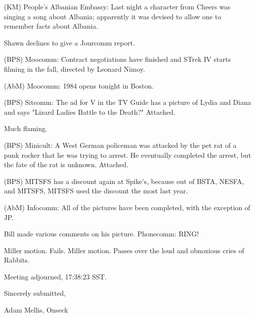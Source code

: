 \documentclass[12pt]{article}
\begin{document}
(KM) People's Albanian Embassy: Last night a character from Cheers was singing a song about Albania; apparently it was devised to allow one to remember facts about Albania.

Shawn declines to give a Jourcomm report.

(BPS) Moocomm: Contract negotiations have finished and STrek IV starts filming in the fall, directed by Leonard Nimoy.

(AbM) Moocomm: 1984 opens tonight in Boston.

(BPS) Sitcomm: The ad for V in the TV Guide has a picture of Lydia and Diana and says "Lizard Ladies Battle to the Death?" Attached.

Much flaming.

(BPS) Minicult: A West German policeman was attacked by the pet rat of a punk rocker that he was trying to arrest. He eventually completed the arrest, but the fate of the rat is unknown. Attached.

(BPS) MITSFS has a discount again at Spike's, because out of BSTA, NESFA, and MITSFS, MITSFS used the discount the most last year.

(AbM) Infocomm: All of the pictures have been completed, with the exception of JP.

Bill made various comments on his picture. Phonecomm: RING!

Miller motion. Fails. Miller motion. Passes over the loud and obnoxious cries of Rabbits.

\vspace{12pt}

\noindent
Meeting adjourned, 17:38:23 SST.

\vspace{18pt}

\centerline{Sincerely submitted,}
\centerline{Adam Mellis, Onseck}
\end{document}
